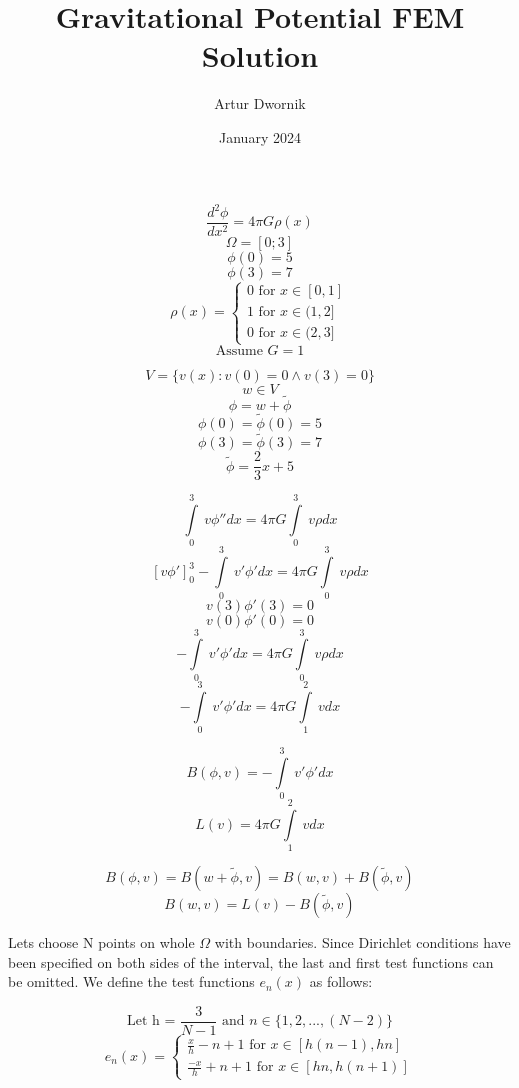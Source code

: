 \documentclass{article}
\title{Gravitational Potential FEM Solution}
\author{Artur Dwornik}
\date{January 2024}
\begin{document}
\maketitle


\[\frac{d^2 \phi}{d x^2} = 4 \pi G \rho(x)\]
\[\Omega = [0; 3]\]
\[\phi(0) = 5\]
\[\phi(3) = 7\]
\[\rho(x) = \begin{cases} 0 \text{ for } x \in [0, 1] \\ 1 \text{ for } x \in (1, 2] \\ 0 \text{ for } x \in (2, 3] \end{cases}\]
\[\text{Assume } G = 1\]

\[V = \{v(x) : v(0) = 0 \land v(3) = 0\}\]
\[w \in V\]
\[\phi = w + \tilde{\phi}\]
\[\phi(0) = \tilde{\phi}(0) = 5\]
\[\phi(3) = \tilde{\phi}(3) = 7\]
\[\tilde{\phi} = \frac{2}{3} x + 5\]

\[\int\limits_0^3\ v \phi'' dx = 4 \pi G \int\limits_0^3\ v \rho dx \]
\[\left[v \phi'\right]_0^3 - \int\limits_0^3\ v' \phi' dx = 4 \pi G \int\limits_0^3\ v \rho dx\]
\[v(3) \phi'(3) = 0\]
\[v(0) \phi'(0) = 0\]
\[- \int\limits_0^3\ v' \phi' dx = 4 \pi G \int\limits_0^3\ v \rho dx\]
\[- \int\limits_0^3\ v' \phi' dx = 4 \pi G \int\limits_1^2\ v dx\]

\[B(\phi, v) = - \int\limits_0^3\ v' \phi' dx\]
\[L(v) = 4 \pi G \int\limits_1^2\ v dx\]

\[B(\phi, v) = B(w + \tilde{\phi}, v) = B(w, v) + B(\tilde{\phi}, v)\]
\[B(w, v) = L(v) - B(\tilde{\phi}, v)\]


Lets choose N points on whole $\Omega$ with boundaries. Since Dirichlet conditions have been specified on both sides of the interval, the last and first test functions can be omitted. We define the test functions 
$e_n(x)$ as follows:

\[\text{Let h = } \frac{3}{N - 1} \text{ and } n \in \{1, 2, ..., (N - 2)\}\]
\[e_n(x) = \begin{cases} \frac{x}{h} - n + 1 \text{ for } x \in [h(n - 1), hn] \\ \frac{-x}{h} + n + 1 \text{ for } x \in [hn, h(n + 1)] \end{cases}\]
\end{document}
